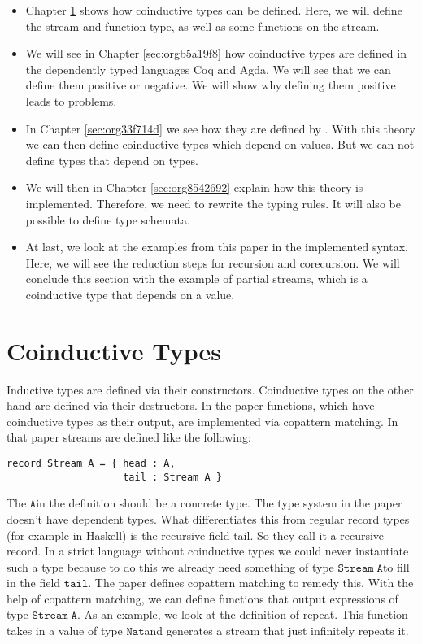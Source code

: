 \documentclass[a4paper,cleardoubleempty,BCOR1cm]{scrbook}
\begin{document}
\begin{itemize}
\item Chapter \ref{sec:org5d34b3c} shows how coinductive types can be defined.
Here, we will define the stream and function type, as well as some
functions on the stream.

\item We will see in Chapter \ref{sec:orgb5a19f8} how
coinductive types are defined in the dependently typed languages Coq and Agda.
We will see that we can define them positive or negative. We will show why
defining them positive leads to problems.

\item In Chapter \ref{sec:org33f714d} we
see how they are defined by \cite{basold2016type}. With this theory we can then
define coinductive types which depend on values.  But we can not define types
that depend on types.

\item We will then in Chapter \ref{sec:org8542692} explain how this theory is
implemented. Therefore, we need to rewrite the typing rules. It will also be
possible to define type schemata.

\item At last, we look at the examples from this paper \cite{basold2016type} in the implemented syntax.
Here, we will see the reduction steps for recursion and corecursion. We will
conclude this section with the example of partial streams, which is a
coinductive type that depends on a value.
\end{itemize}

\chapter{Coinductive Types}
\label{sec:org5d34b3c}
Inductive types are defined via their constructors.  Coinductive types on
the other hand are defined via their destructors.  In the paper \cite{abel2013copatterns}
functions, which have coinductive types as their output, are implemented via
copattern matching.  In that paper streams are defined like the following:

\begin{lstlisting}
record Stream A = { head : A,
                    tail : Stream A }
\end{lstlisting}

The $\mathtt{A}$\;in the definition should be a concrete type. The type system in the
paper doesn't have dependent types. What differentiates this from regular record
types (for example in Haskell) is the recursive field tail. So they call it a
recursive record. In a strict language without coinductive types we could never
instantiate such a type because to do this we already need something of type
$\mathtt{Stream\;A}$\;to fill in the field $\mathtt{tail}$. The paper defines
copattern matching to remedy this. With the help of copattern matching, we can define functions
that output expressions of type $\mathtt{Stream\;A}$. As an example, we look at the
definition of repeat. This function takes in a value of type $\mathtt{Nat}$\;and
generates a stream that just infinitely repeats it.
\end{document}
